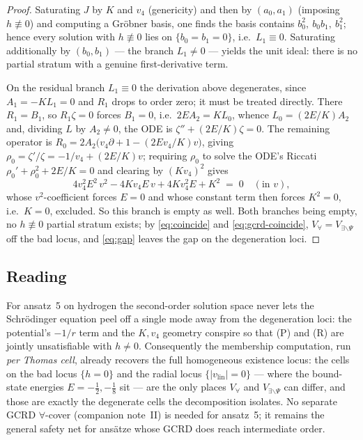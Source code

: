 \documentclass[11pt]{article}
\newcommand{\Vall}{V_{\forall}}
\newcommand{\Vex}{V_{\exists\backslash\Psi}}
\newcommand{\vlin}{v_{\mathrm{lin}}}
\begin{document}
\begin{proof}
Saturating $J$ by $K$ and $v_4$ (genericity) and then by $(a_0,a_1)$
(imposing $h\not\equiv 0$) and computing a Gr\"obner basis, one finds the basis
contains $b_0^2,\ b_0b_1,\ b_1^2$; hence every solution with $h\not\equiv 0$
lies on $\{b_0=b_1=0\}$, i.e.\ $L_1\equiv0$. Saturating additionally by
$(b_0,b_1)$ --- the branch $L_1\neq0$ --- yields the unit ideal: there is no
partial stratum with a genuine first-derivative term.

On the residual branch $L_1\equiv0$ the derivation above degenerates, since
$A_1=-KL_1=0$ and $R_1$ drops to order zero; it must be treated directly.
There $R_1=B_1$, so $R_1\zeta=0$ forces $B_1=0$, i.e.\ $2EA_2=KL_0$, whence
$L_0=(2E/K)A_2$ and, dividing $L$ by $A_2\neq0$, the ODE is
$\zeta''+(2E/K)\zeta=0$. The remaining operator is
$R_0=2A_2\big(v_4\partial+1-(2Ev_4/K)v\big)$, giving
$\rho_0=\zeta'/\zeta=-1/v_4+(2E/K)v$; requiring $\rho_0$ to solve the ODE's
Riccati $\rho_0'+\rho_0^2+2E/K=0$ and clearing by $(Kv_4)^2$ gives
\[
4v_4^2E^2\,v^2-4Kv_4E\,v+4Kv_4^2E+K^2\;=\;0\quad(\text{in }v),
\]
whose $v^2$-coefficient forces $E=0$ and whose constant term then forces
$K^2=0$, i.e.\ $K=0$, excluded. So this branch is empty as well. Both branches
being empty, no $h\not\equiv0$ partial stratum exists; by \eqref{eq:coincide}
and \eqref{eq:gcrd-coincide}, $\Vall=\Vex$ off the bad locus, and
\eqref{eq:gap} leaves the gap on the degeneration loci.
\end{proof}

\subsection{Reading}

For ansatz~5 on hydrogen the second-order solution space never lets the
Schr\"odinger equation peel off a single mode away from the degeneration loci:
the potential's $-1/r$ term and the $K,v_4$ geometry conspire so that (P) and
(R) are jointly unsatisfiable with $h\neq0$. Consequently the membership
computation, run \emph{per Thomas cell}, already recovers the full homogeneous
existence locus: the cells on the bad locus $\{h=0\}$ and the radial locus
$\{|\vlin|=0\}$ --- where the bound-state energies $E=-\tfrac12,-\tfrac18$ sit
--- are the only places $\Vall$ and $\Vex$ can differ, and those are exactly the
degenerate cells the decomposition isolates. No separate GCRD $\forall$-cover
(companion note~II) is needed for ansatz~5; it remains the general safety net
for ans\"atze whose GCRD does reach intermediate order.
\end{document}
